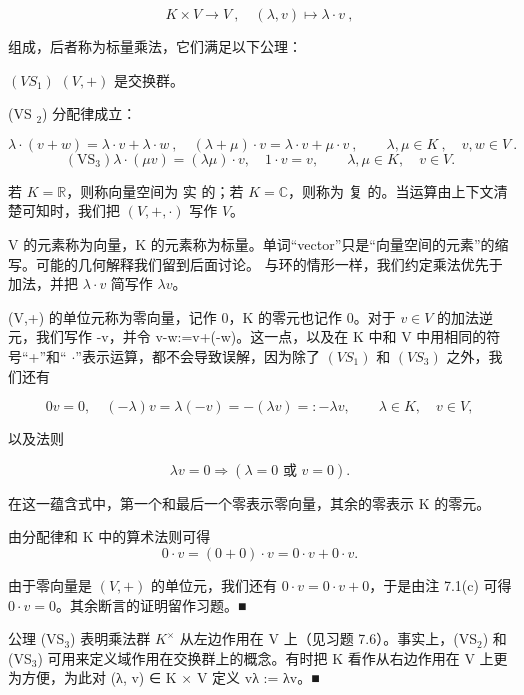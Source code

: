 \[
K\times V\to V~,\quad(\lambda,v)\mapsto\lambda\cdot v~,
\]

组成，后者称为标量乘法，它们满足以下公理：

$ (VS_{1}) $  $ (V,+) $ 是交换群。

(VS $ _{2} $) 分配律成立：

\[
\lambda\cdot(v+w)=\lambda\cdot v+\lambda\cdot w~,\quad(\lambda+\mu)\cdot v=\lambda\cdot v+\mu\cdot v~,\qquad\lambda,\mu\in K~,\quad v,w\in V~.
\]
\[
\left(\mathrm{V S}_{3}\right)\lambda\cdot(\mu v)=(\lambda\mu)\cdot v,\quad1\cdot v=v,\qquad\lambda,\mu\in K,\quad v\in V.
\]

若  $ K = \mathbb{R} $，则称向量空间为  $ \text{实} $ 的；若  $ K = \mathbb{C} $，则称为  $ \text{复} $ 的。当运算由上下文清楚可知时，我们把  $ (V, +, \cdot) $ 写作  $ V $。

\begin{remark}

\begin{items}
\item

V 的元素称为向量，K 的元素称为标量。单词“vector”只是“向量空间的元素”的缩写。可能的几何解释我们留到后面讨论。
与环的情形一样，我们约定乘法优先于加法，并把  $ \lambda \cdot v $ 简写作  $ \lambda v $。

\item

(V,+) 的单位元称为零向量，记作 0，K 的零元也记作 0。对于 $ v\in V $ 的加法逆元，我们写作 -v，并令 v-w:=v+(-w)。这一点，以及在 K 中和 V 中用相同的符号“+”和“ $ \cdot $”表示运算，都不会导致误解，因为除了 $ (VS_{1}) $ 和 $ (VS_{3}) $ 之外，我们还有

\[
0v=0,\quad(-\lambda)v=\lambda(-v)=-(\lambda v)=:-\lambda v,\qquad\lambda\in K,\quad v\in V,
\]

以及法则

\[
\lambda v=0\Rightarrow\left(\lambda=0\text{ 或 }v=0\right).
\]

在这一蕴含式中，第一个和最后一个零表示零向量，其余的零表示 K 的零元。

\proofhead
由分配律和 K 中的算术法则可得
\[
0\cdot v=(0+0)\cdot v=0\cdot v+0\cdot v.
\]

由于零向量是  $ (V, +) $ 的单位元，我们还有  $ 0 \cdot v = 0 \cdot v + 0 $，于是由注 7.1(c) 可得  $ 0 \cdot v = 0 $。其余断言的证明留作习题。■

\item

公理 (VS$_3$) 表明乘法群 $K^\times$ 从左边作用在 V 上（见习题 7.6）。事实上，(VS$_2$) 和 (VS$_3$) 可用来定义域作用在交换群上的概念。有时把 K 看作从右边作用在 V 上更为方便，为此对 (λ, v) ∈ K × V 定义 vλ := λv。■

\end{items}

\end{remark}

